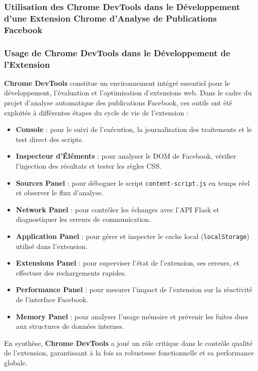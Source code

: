 \subsubsection{Utilisation des Chrome DevTools dans le Développement d'une Extension Chrome d'Analyse de Publications Facebook}
\vspace{0.3cm}
\subsubsection*{ Usage de Chrome DevTools dans le Développement de l'Extension}


\textbf{Chrome DevTools} constitue un environnement intégré essentiel pour le développement, l’évaluation et l’optimisation d’extensions web. Dans le cadre du projet d’analyse automatique des publications Facebook, ces outils ont été exploités à différentes étapes du cycle de vie de l’extension :


\begin{itemize}
  \item \textbf{Console} : pour le suivi de l’exécution, la journalisation des traitements et le test direct des scripts.
  \item \textbf{Inspecteur d’Éléments} : pour analyser le DOM de Facebook, vérifier l’injection des résultats et tester les règles CSS.
  \item \textbf{Sources Panel} : pour déboguer le script \texttt{content-script.js} en temps réel et observer le flux d’analyse.
  \item \textbf{Network Panel} : pour contrôler les échanges avec l’API Flask et diagnostiquer les erreurs de communication.
  \item \textbf{Application Panel} : pour gérer et inspecter le cache local (\texttt{localStorage}) utilisé dans l’extension.
  \item \textbf{Extensions Panel} : pour superviser l’état de l’extension, ses erreurs, et effectuer des rechargements rapides.
  \item \textbf{Performance Panel} : pour mesurer l’impact de l’extension sur la réactivité de l’interface Facebook.
  \item \textbf{Memory Panel} : pour analyser l’usage mémoire et prévenir les fuites dues aux structures de données internes.
\end{itemize}


En synthèse, \textbf{Chrome DevTools} a joué un rôle critique dans le contrôle qualité de l’extension, garantissant à la fois sa robustesse fonctionnelle et sa performance globale.



